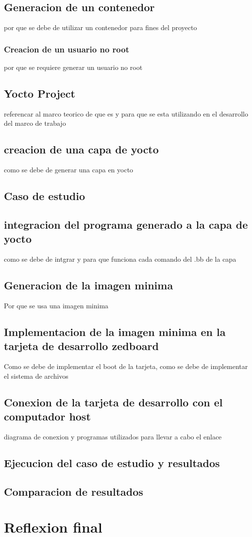 \subsection{Generacion de un contenedor}
por que se debe de utilizar un contenedor para fines del proyecto
\subsubsection{Creacion de un usuario no root}
por que se requiere generar un usuario no root 
\subsection{Yocto Project}
referencar al marco teorico de que es y para que se esta utilizando en el desarrollo del marco de trabajo
\subsection{creacion de una capa de yocto}
como se debe de generar una capa en yocto
\subsection{Caso de estudio}
\subsection{integracion del programa generado a la capa de yocto}
como se debe de intgrar y para que funciona cada comando del .bb de la capa
\subsection{Generacion de la imagen minima}
Por que se usa una imagen minima 
\subsection{Implementacion de la imagen minima en la tarjeta de desarrollo zedboard}
Como se debe de implementar el boot de la tarjeta, como se debe de implementar el  sistema de archivos
\subsection{Conexion de la tarjeta de desarrollo con el computador host}
diagrama de conexion y programas utilizados para llevar a cabo el enlace

\subsection{Ejecucion del caso de estudio y resultados}

\subsection{Comparacion de resultados}

\section{Reflexion final}